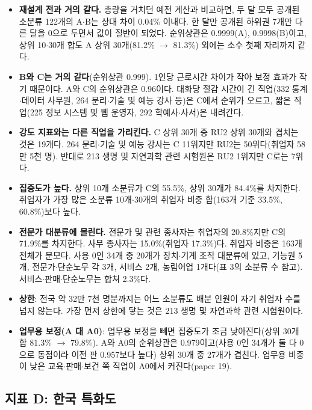 \documentclass[11pt]{article}
\begin{document}
\begin{itemize}[leftmargin=*]
  \item \textbf{재설계 전과 거의 같다.} 총량을 거치던 예전 계산과 비교하면, 두 달 모두 공개된 소분류 122개의 A$\cdot$B는 상대 차이 0.04\% 이내다. 한 달만 공개된 하위권 7개만 다른 달을 0으로 두면서 값이 절반이 되었다. 순위상관은 0.9999(A), 0.9998(B)이고, 상위 10$\cdot$30개 합도 A 상위 30개(81.2\% $\to$ 81.3\%) 외에는 소수 첫째 자리까지 같다.
  \item \textbf{B와 C는 거의 같다}(순위상관 0.999). 1인당 근로시간 차이가 작아 보정 효과가 작기 때문이다. A와 C의 순위상관은 0.96이다. 대화당 절감 시간이 긴 직업(332 통계$\cdot$데이터 사무원, 264 문리$\cdot$기술 및 예능 강사 등)은 C에서 순위가 오르고, 짧은 직업(225 정보 시스템 및 웹 운영자, 292 학예사$\cdot$사서)은 내려간다.
  \item \textbf{강도 지표와는 다른 직업을 가리킨다.} C 상위 30개 중 RU2 상위 30개와 겹치는 것은 19개다. 264 문리$\cdot$기술 및 예능 강사는 C 11위지만 RU2는 50위다(취업자 58만 5천 명). 반대로 213 생명 및 자연과학 관련 시험원은 RU2 1위지만 C로는 7위다.
  \item \textbf{집중도가 높다.} 상위 10개 소분류가 C의 55.5\%, 상위 30개가 84.4\%를 차지한다. 취업자가 가장 많은 소분류 10개$\cdot$30개의 취업자 비중 합(163개 기준 33.5\%, 60.8\%)보다 높다.
  \item \textbf{전문가 대분류에 몰린다.} 전문가 및 관련 종사자는 취업자의 20.8\%지만 C의 71.9\%를 차지한다. 사무 종사자는 15.0\%(취업자 17.3\%)다. 취업자 비중은 163개 전체가 분모다. 사용 0인 34개 중 20개가 장치$\cdot$기계 조작 대분류에 있고, 기능원 5개, 전문가$\cdot$단순노무 각 3개, 서비스 2개, 농림어업 1개다(표 3의 소분류 수 참고). 서비스$\cdot$판매$\cdot$단순노무는 합쳐 2.3\%다.
  \item \textbf{상한}: 전국 약 32만 7천 명분까지는 어느 소분류도 배분 인원이 자기 취업자 수를 넘지 않는다. 가장 먼저 상한에 닿는 것은 213 생명 및 자연과학 관련 시험원이다.
  \item \textbf{업무용 보정(A 대 A0)}: 업무용 보정을 빼면 집중도가 조금 낮아진다(상위 30개 합 81.3\% $\to$ 79.8\%). A와 A0의 순위상관은 0.979이고(사용 0인 34개가 둘 다 0으로 동점이라 이전 판 0.957보다 높다) 상위 30개 중 27개가 겹친다. 업무용 비중이 낮은 교육$\cdot$판매$\cdot$보건 쪽 직업이 A0에서 커진다(paper 19).
\end{itemize}

\subsection{지표 D: 한국 특화도}
\end{document}
